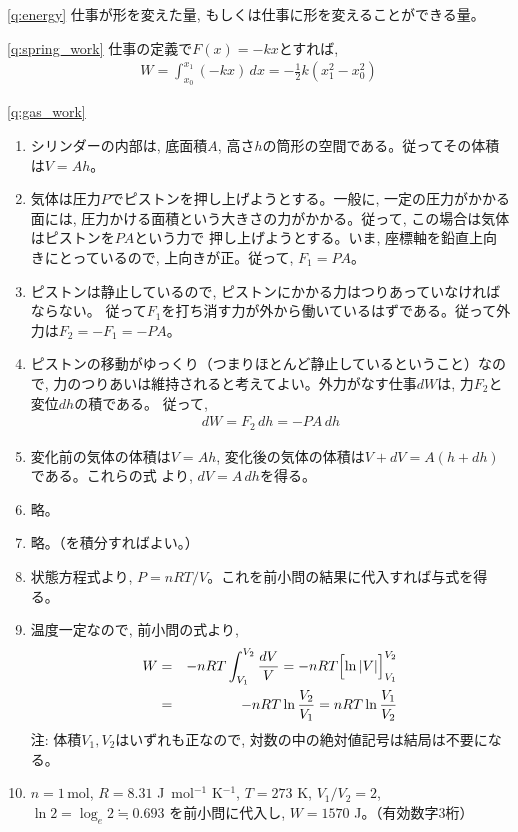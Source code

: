 % 
\ref{q:energy}
仕事が形を変えた量, もしくは仕事に形を変えることができる量。
\vspace{0.2cm}

% 
\ref{q:spring_work}
仕事の定義で$F(x)=-kx$とすれば, 
\begin{eqnarray}W=\int_{x_0}^{x_1}(-kx)\,dx=-\frac{1}{2}k(x_1^2-x_0^2)\end{eqnarray}
\vspace{0.2cm}

% 
\ref{q:gas_work}　
\begin{enumerate}
\item シリンダーの内部は, 底面積$A$, 高さ$h$の筒形の空間である。従ってその体積は$V=Ah$。
\item 気体は圧力$P$でピストンを押し上げようとする。一般に, 一定の圧力がかかる面には, 
圧力かける面積という大きさの力がかかる。従って, この場合は気体はピストンを$PA$という力で
押し上げようとする。いま, 座標軸を鉛直上向きにとっているので, 上向きが正。従って, $F_1=PA$。
\item ピストンは静止しているので, ピストンにかかる力はつりあっていなければならない。
従って$F_1$を打ち消す力が外から働いているはずである。従って外力は$F_2=-F_1=-PA$。
\item ピストンの移動がゆっくり（つまりほとんど静止しているということ）なので, 
力のつりあいは維持されると考えてよい。外力がなす仕事$dW$は, 力$F_2$と変位$dh$の積である。
従って, 
\begin{eqnarray}dW=F_2\,dh=-PA\,dh\end{eqnarray}
\item 変化前の気体の体積は$V=Ah$, 変化後の気体の体積は$V+dV=A(h+dh)$である。これらの式
より, $dV=A\,dh$を得る。
\item 略。
\item 略。（を積分すればよい。）
\item 状態方程式より, $P=nRT/V$。これを前小問の結果に代入すれば与式を得る。
\item 温度一定なので, 前小問の式より, 
\begin{eqnarray}
W&=&-nRT\int_{V_1}^{V_2}\frac{dV}{V}=-nRT\Bigl[\ln|V|\Bigr]_{V_1}^{V_2}\nonumber\\
&=&-nRT\ln \frac{V_2}{V_1}=nRT\ln \frac{V_1}{V_2}
\end{eqnarray}
注: 体積$V_1, V_2$はいずれも正なので, 対数の中の絶対値記号は結局は不要になる。
\item $n=1\,$mol, $R=8.31$ J~mol$^{-1}$ K$^{-1}$, $T=273$ K, $V_1/V_2=2$, $\ln 2=\log_e 2\fallingdotseq0.693$
を前小問に代入し, $W=1570$ J。（有効数字3桁）
\end{enumerate}
\vspace{0.2cm}

